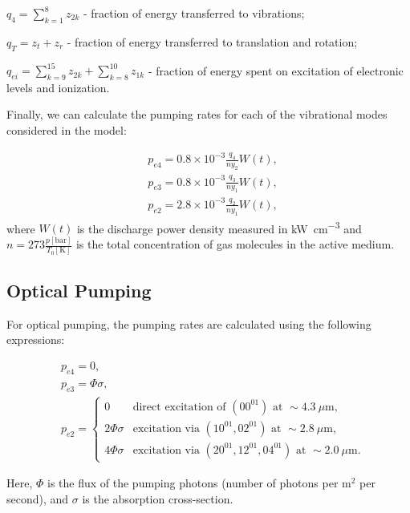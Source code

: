$q_4 = \sum\limits_{k=1}^8 z_{2k}$ - fraction of energy transferred to  vibrations;

$q_T = z_t + z_r$ - fraction of energy transferred to translation and rotation;

$q_{ei} = \sum\limits_{k=9}^{15} z_{2k}  + \sum\limits_{k=8}^{10} z_{1k}$ - fraction of energy spent on excitation of electronic levels and ionization.

Finally, we can calculate the pumping rates for each of the vibrational modes considered in the model:

\begin{equation}\label{eq:pumping_rates_discharge}
\begin{aligned}
&p_{e4} = 0.8\times 10^{-3} \frac{q_4}{n y_2} W(t),\\
&p_{e3} = 0.8\times 10^{-3}\frac{q_3}{n y_1} W(t),\\
&p_{e2} = 2.8\times 10^{-3}\frac{q_2}{n y_1} W(t),
\end{aligned}
\end{equation}
where $W(t)$ is the discharge power density measured in \si{\kilo\watt\per\cm^3} and $n = 273 \frac{p[\text{bar}]}{T_0[\text{K}]}$ is the total concentration of gas molecules in the active medium.


\subsection{Optical Pumping}

For optical pumping, the pumping rates are calculated using the following expressions:

\begin{equation}\label{eq:pumping_rates_optical}
\begin{aligned}
&p_{e4} = 0, \\
&p_{e3} = \Phi \sigma, \\
&p_{e2} = \begin{cases} 
  0             & \text{direct excitation of } (00^01) \text{ at } \sim 4.3~\mu\text{m}, \\
  2 \Phi \sigma & \text{excitation via } (10^01, 02^01) \text{ at } \sim 2.8~\mu\text{m}, \\
  4 \Phi \sigma & \text{excitation via } (20^01, 12^01, 04^01) \text{ at } \sim 2.0~\mu\text{m}.
\end{cases}
\end{aligned}
\end{equation}

Here, $\Phi$ is the flux of the pumping photons (number of photons per $\text{m}^2$ per second), and $\sigma$ is the absorption cross-section. 


